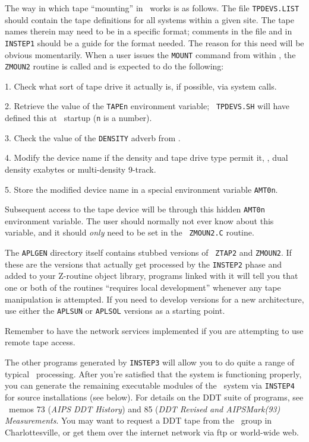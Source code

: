 The way in which tape ``mounting'' in \AIPS\ works is as follows.  The
file {\tt TPDEVS.LIST} should contain the tape definitions for all systems
within a given site.  The tape names therein may need to be in a specific
format; comments in the file and in {\tt INSTEP1} should be a guide for
the format needed.  The reason for this need will be obvious momentarily.
When a user issues the {\tt MOUNT} command from within \ttaips, the {\tt
ZMOUN2} routine is called and is expected to do the following:\medskip

\item{1.} Check what sort of tape drive it actually is, if possible, via
        system calls.
\item{2.} Retrieve the value of the {\tt TAPEn} environment variable; {\tt
        TPDEVS.SH} will have defined this at \ttaips\ startup ({\tt n} is
        a number).
\item{3.} Check the value of the {\tt DENSITY} adverb from \ttaips.
\item{4.} Modify the device name if the density and tape drive type permit
        it, \ie, dual density exabytes or multi-density 9-track.
\item{5.} Store the modified device name in a special environment variable
        {\tt AMT0n}.\medskip

\noindent Subsequent access to the tape device will be through this hidden
{\tt AMT0n} environment variable.  The user should normally not ever know
about this variable, and it should {\it only\/} need to be set in the {\tt
ZMOUN2.C} routine.

The {\tt\dol APLGEN} directory itself contains stubbed versions of {\tt
ZTAP2} and {\tt ZMOUN2}.  If these are the versions that actually get
processed by the {\tt INSTEP2} phase and added to your Z-routine object
library, programs linked with it will tell you that one or both of the
routines ``requires local development'' whenever any tape manipulation is
attempted.  If you need to develop versions for a new architecture, use
either the {\tt \dol APLSUN} or {\tt\dol APLSOL} versions as a starting
point.

Remember to have the network services implemented if you are attempting to
use remote tape access. \medskip


The other programs generated by {\tt INSTEP3} will allow you to do quite a
range of typical \AIPS\ processing.  After you're satisfied that the
system is functioning properly, you can generate the remaining executable
modules of the \AIPS\ system via {\tt INSTEP4} for source installations
(see below).  For details on the DDT suite of programs, see \AIPS\ memos
73 ({\it AIPS DDT History}) and 85 ({\it DDT Revised and AIPSMark(93)
Measurements\/}.  You may want to request a DDT tape from the \AIPS\ group
in Charlottesville, or get them over the internet network via ftp or
world-wide web.

